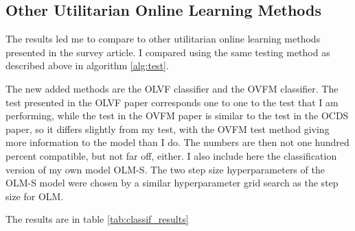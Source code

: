 \subsection{Other Utilitarian Online Learning Methods}

The results led me to compare to other utilitarian online learning methods
presented in the survey article. I compared using the same testing method as
described above in algorithm \ref{alg:test}.

The new added methods are the OLVF classifier and the OVFM classifier. The test
presented in the OLVF paper corresponds one to one to the test that I am
performing, while the test in the OVFM paper is similar to the test in the OCDS
paper, so it differs slightly from my test, with the OVFM test method giving
more information to the model than I do. The numbers are then not one hundred
percent compatible, but not far off, either. I also include here the
classification version of my own model OLM-S. The two step size hyperparameters
of the OLM-S model were chosen by a similar hyperparameter grid search as the
step size for OLM.

The results are in table \ref{tab:classif_results}

